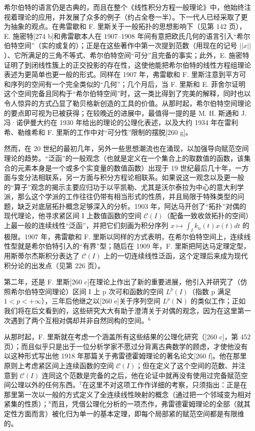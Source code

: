 希尔伯特的语言仍是古典的，而且在整个《线性积分方程一般理论》中，他始终注视着理论的应用，并发展了众多的例子（约占全卷一半）。下一代人已经采取了更为抽象的观点。在弗雷歇和 F. 里斯关于一般拓扑的思想影响下（见第 142 页），E. 施密特{[}274 b{]}和弗雷歇本人在 1907–1908 年间有意把欧氏几何的语言引入“希尔伯特空间”（实的或复的）；正是在这些著作中第一次提到范数（用现在的记号 \(||x||\)）、它所满足的三角不等式、希尔伯特空间“可分”且完备的事实；此外，E. 施密特证明了到闭线性簇上的正交投影的存在性，这使他能把希尔伯特的线性方程组理论表述为更简单也更一般的形式。同样在 1907 年，弗雷歇和 F. 里斯注意到平方可和序列的空间有一个完全类似的“几何”；几个月后，当 F. 里斯和 E. 菲舍尔证明这个空间完备且同构于“希尔伯特空间”时，这一类比得到了完美的解释，同时也以令人惊异的方式凸显了勒贝格新创造的工具的价值。从那时起，希尔伯特空间理论的要点即可视为已被获得；在较晚近的进展中，最值得一提的是 M. H. 斯通和 J. 冯·诺伊曼大约在 1930 年给出的理论的公理化表述，以及大约 1934 年在雷利希、勒维希和 F. 里斯的工作中对“可分性”限制的摆脱{[}260 g{]}。

然而，在 20 世纪的最初几年，另外一些思想潮流也在涌现，以加强导向赋范空间理论的趋势。“泛函”的一般观念（也就是定义在一个集合上的取数值的函数，该集合的元素本身是一个或多个实变量的数值函数）出现于 19 世纪最后几十年，一方面与变分法相联系，另一方面与积分方程论相联系。如果说这一观念以及更一般的“算子”观念的揭示主要应归功于以平凯勒、尤其是沃尔泰拉为中心的意大利学派，那么这个学派的工作往往仍带有相当形式的性质，并且局限于特殊类型的问题，缺乏对底层拓扑概念足够深入的分析。1903 年，阿达马开创了“拓扑”对偶的现代理论，他寻求紧区间 I 上数值函数的空间 \(\mathcal{C}(I)\)（配备一致收敛拓扑的空间）上最一般的连续线性“泛函”，并把它们刻画为积分序列 \(x \mapsto \int_{I} k_{n}(t)x(t)dt\) 的极限。1907 年，弗雷歇和 F. 里斯以同样的方式表明，在希尔伯特空间上，连续线性型就是希尔伯特引入的“有界”型；随后在 1909 年，F. 里斯把阿达马定理定型，用斯蒂尔杰斯积分表达了 \(\mathcal{C}(I)\) 上的一切连续线性泛函，这个定理后来成为现代积分论的出发点（见第 226 页）。

第二年，还是 F. 里斯{[}260 c{]}在理论上作出了新的重要进展，他引入并研究了（仿照希尔伯特空间理论）区间 I 上 p 次可和函数的空间 \(L^{p}(I)\)（指数 p 满足 \(1 < p < +\infty\)），三年后他继之以{[}260 e{]}关于序列空间 \(L^{p}(\mathbf{N})\) 的类似工作；正如我们将在后文看到的，这些研究大大有助于澄清关于对偶的观念，因为在这里第一次遇到了两个互相对偶却并非自然同构的空间。\(^{6}\)

从那时起，F. 里斯就在考虑一个涵盖所有这些结果的公理化研究（{[}260 c{]}，第 452 页）；而且似乎只是出于一位分析学家不愿过分背离古典数学的顾虑，才使他没有以这种形式写出他 1918 年那篇关于弗雷德霍姆理论的著名论文{[}260 f{]}。他在那里原则上考虑紧区间上连续函数的空间 \(\mathcal{C}(I)\)；但在定义了这个空间的范数、并注意到 \(\mathcal{C}(I)\) 连同这个范数是完备的之后，他在论证中就再没有使用过完备赋范空间公理以外的任何东西。\(^{7}\)在这里不对这项工作作详细的考察，只须指出：正是在那里第一次以一般的方式定义了全连续线性映射的概念（通过把一个邻域变为相对紧集的性质）；\(^{8}\)而且，凭借公理化分析的一项杰作，弗雷德霍姆理论的全部（就其定性方面而言）被化归为单一的基本定理，即每个局部紧的赋范空间都是有限维的。

